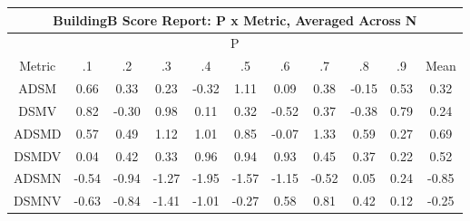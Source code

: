 \documentclass[11pt,a4paper]{report}
\begin{document}
\begin{longtable}{ | c || c | c | c | c | c | c | c | c | c || c |}
\hline
\multicolumn{11}{|c|}{ BuildingB Score Report: P x Metric, Averaged Across N } \\
\hline
\multicolumn{11}{|c|}{ P } \\
\hline
Metric & .1 & .2 & .3 & .4 & .5 & .6 & .7 & .8 & .9 & Mean\\
\hline
\hline
\endhead
ADSM &  \cellcolor[HTML]{EFEFFF} 0.66 &  \cellcolor[HTML]{F7F7FF} 0.33 &  \cellcolor[HTML]{F7F7FF} 0.23 &  \cellcolor[HTML]{FFF7F7} -0.32 &  \cellcolor[HTML]{E7E7FF} 1.11 &  \cellcolor[HTML]{FFFFFF} 0.09 &  \cellcolor[HTML]{F7F7FF} 0.38 &  \cellcolor[HTML]{FFFFFF} -0.15 &  \cellcolor[HTML]{EFEFFF} 0.53 &  \cellcolor[HTML]{F7F7FF} 0.32 \\
DSMV &  \cellcolor[HTML]{E7E7FF} 0.82 &  \cellcolor[HTML]{FFF7F7} -0.30 &  \cellcolor[HTML]{E7E7FF} 0.98 &  \cellcolor[HTML]{FFFFFF} 0.11 &  \cellcolor[HTML]{F7F7FF} 0.32 &  \cellcolor[HTML]{FFEFEF} -0.52 &  \cellcolor[HTML]{F7F7FF} 0.37 &  \cellcolor[HTML]{FFF7F7} -0.38 &  \cellcolor[HTML]{E7E7FF} 0.79 &  \cellcolor[HTML]{F7F7FF} 0.24 \\
ADSMD &  \cellcolor[HTML]{EFEFFF} 0.57 &  \cellcolor[HTML]{EFEFFF} 0.49 &  \cellcolor[HTML]{DFDFFF} 1.12 &  \cellcolor[HTML]{E7E7FF} 1.01 &  \cellcolor[HTML]{E7E7FF} 0.85 &  \cellcolor[HTML]{FFFFFF} -0.07 &  \cellcolor[HTML]{DFDFFF} 1.33 &  \cellcolor[HTML]{EFEFFF} 0.59 &  \cellcolor[HTML]{F7F7FF} 0.27 &  \cellcolor[HTML]{EFEFFF} 0.69 \\
DSMDV &  \cellcolor[HTML]{FFFFFF} 0.04 &  \cellcolor[HTML]{F7F7FF} 0.42 &  \cellcolor[HTML]{F7F7FF} 0.33 &  \cellcolor[HTML]{E7E7FF} 0.96 &  \cellcolor[HTML]{E7E7FF} 0.94 &  \cellcolor[HTML]{E7E7FF} 0.93 &  \cellcolor[HTML]{F7F7FF} 0.45 &  \cellcolor[HTML]{F7F7FF} 0.37 &  \cellcolor[HTML]{F7F7FF} 0.22 &  \cellcolor[HTML]{EFEFFF} 0.52 \\
ADSMN &  \cellcolor[HTML]{FFEFEF} -0.54 &  \cellcolor[HTML]{FFE7E7} -0.94 &  \cellcolor[HTML]{FFDFDF} -1.27 &  \cellcolor[HTML]{FFCFCF} -1.95 &  \cellcolor[HTML]{FFD7D7} -1.57 &  \cellcolor[HTML]{FFDFDF} -1.15 &  \cellcolor[HTML]{FFEFEF} -0.52 &  \cellcolor[HTML]{FFFFFF} 0.05 &  \cellcolor[HTML]{F7F7FF} 0.24 &  \cellcolor[HTML]{FFE7E7} -0.85 \\
DSMNV &  \cellcolor[HTML]{FFEFEF} -0.63 &  \cellcolor[HTML]{FFE7E7} -0.84 &  \cellcolor[HTML]{FFDFDF} -1.41 &  \cellcolor[HTML]{FFE7E7} -1.01 &  \cellcolor[HTML]{FFF7F7} -0.27 &  \cellcolor[HTML]{EFEFFF} 0.58 &  \cellcolor[HTML]{E7E7FF} 0.81 &  \cellcolor[HTML]{F7F7FF} 0.42 &  \cellcolor[HTML]{FFFFFF} 0.12 &  \cellcolor[HTML]{FFF7F7} -0.25 \\

\end{longtable}
\end{document}

